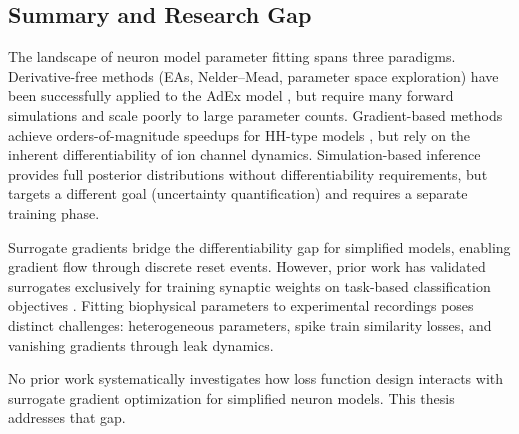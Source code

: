 \subsection{Summary and Research Gap}\label{sec:rw:summary}

The landscape of neuron model parameter fitting spans three paradigms.
Derivative-free methods (\glspl{EA}, Nelder--Mead, parameter space exploration) have been successfully applied to the \gls{AdEx} model \cite{Marin2020, Cruz2021, Guarino2025}, but require many forward simulations and scale poorly to large parameter counts.
Gradient-based methods achieve orders-of-magnitude speedups for \gls{HH}-type models \cite{Deistler2025, Jones2024}, but rely on the inherent differentiability of ion channel dynamics.
Simulation-based inference \cite{Goncalves2020} provides full posterior distributions without differentiability requirements, but targets a different goal (uncertainty quantification) and requires a separate training phase.

Surrogate gradients bridge the differentiability gap for simplified models, enabling gradient flow through discrete reset events.
However, prior work has validated surrogates exclusively for training synaptic weights on task-based classification objectives \cite{Neftci2019, Zenke2018, Gerum2021, Perez-Nieves2021}.
Fitting biophysical parameters to experimental recordings poses distinct challenges: heterogeneous parameters, spike train similarity losses, and vanishing gradients through leak dynamics.

No prior work systematically investigates how loss function design interacts with surrogate gradient optimization for simplified neuron models.
This thesis addresses that gap.
